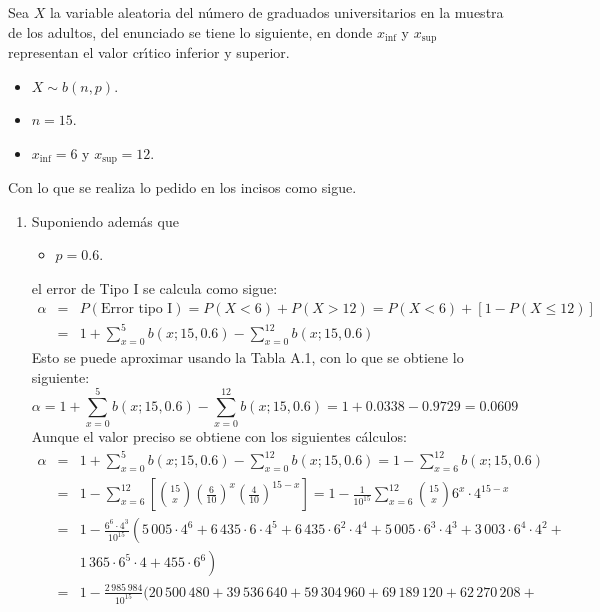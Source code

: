 \begin{solucion}
 Sea $X$ la variable aleatoria del n\'umero de graduados universitarios en la muestra de los adultos, del enunciado se tiene lo siguiente, en donde $x_{\text{inf}}$ y $x_{\text{sup}}$ representan el valor cr\'{\i}tico inferior y superior.
 \begin{itemize}
  \item $X \sim b(n,p)$.
  \item $n=15$.
  \item $x_{\text{inf}} = 6$ y $x_{\text{sup}} = 12$.
 \end{itemize}
 Con lo que se realiza lo pedido en los incisos como sigue.
 \begin{enumerate}
  \item Suponiendo adem\'as que
  \begin{itemize}
   \item $p = 0.6$.
  \end{itemize}
  el error de Tipo I se calcula como sigue:
  \begin{eqnarray*}
   \alpha & = & P\left( \text{Error tipo I} \right) = P(X < 6) + P(X > 12) = P(X < 6) + \left[ 1 - P(X \leq 12) \right] \\
   & = & 1 + \sum_{x=0}^{5} b(x;15,0.6) - \sum_{x=0}^{12} b(x;15,0.6)
  \end{eqnarray*}
  Esto se puede aproximar usando la Tabla A.1, con lo que se obtiene lo siguiente:
  \begin{equation*}
   \alpha = 1 + \sum_{x=0}^{5} b(x;15,0.6) - \sum_{x=0}^{12} b(x;15,0.6) = 1 + 0.0338 - 0.9729 = 0.0609
  \end{equation*}
  Aunque el valor preciso se obtiene con los siguientes c\'alculos:
  \begin{eqnarray*}
   \alpha & = & 1 + \sum_{x=0}^{5} b(x;15,0.6) - \sum_{x=0}^{12} b(x;15,0.6) = 1 - \sum_{x=6}^{12} b(x;15,0.6) \\
   & = & 1 - \sum_{x = 6}^{12} \left[ \binom{15}{x} \left( \frac{6}{10} \right)^{x}\left( \frac{4}{10} \right)^{15-x} \right] = 1 - \frac{1}{10^{15}} \sum_{x=6}^{12} \binom{15}{x}6^x\cdot4^{15-x} \\
   & = & 1 - \frac{6^6\cdot 4^3}{10^{15}} \left( 5\,005\cdot4^6 + 6\,435\cdot6\cdot4^5 + 6\,435\cdot6^2\cdot4^4 + 5\,005\cdot6^3\cdot4^3 + 3\,003\cdot6^4\cdot4^2 + \right. \\
   & & \left. 1\,365\cdot6^5\cdot4 + 455\cdot6^6 \right) \\
   & = & 1 - \frac{2\,985\,984}{10^{15}}(20\,500\,480 + 39\,536\,640 + 59\,304\,960 + 69\,189\,120 + 62\,270\,208 + \\

\end{eqnarray*}
\end{enumerate}
\end{solucion}

